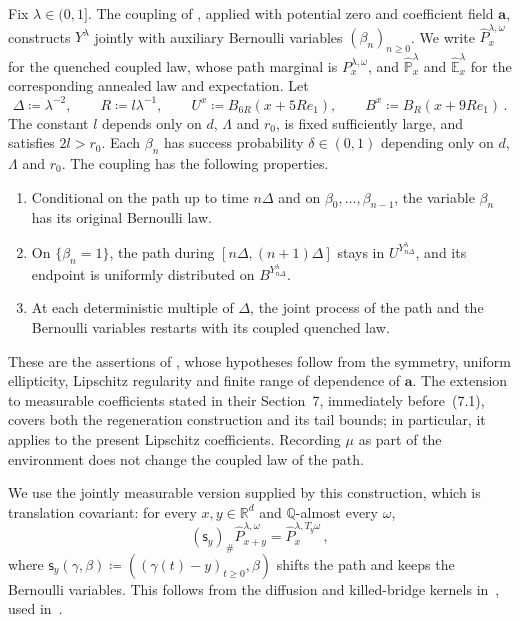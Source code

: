 \documentclass[11pt]{amsart}
\theoremstyle{definition}
\theoremstyle{remark}
\numberwithin{equation}{section}
\newcommand{\Q}{\mathbb Q}
\newcommand{\R}{\mathbb R}
\renewcommand{\a}{\mathbf a}
\begin{document}
Fix $\lambda\in(0,1]$. The coupling of \citet[Proposition~5.4]{Einstein2012gantert}, applied with potential zero and coefficient field $\a$, constructs $Y^\lambda$ jointly with auxiliary Bernoulli variables $(\beta_n)_{n\geq0}$. We write $\widehat P^{\lambda,\omega}_x$ for the quenched coupled law, whose path marginal is $P^{\lambda,\omega}_x$, and $\widehat{\mathbb P}^\lambda_x$ and $\widehat{\mathbb E}^\lambda_x$ for the corresponding annealed law and expectation. Let
\begin{equation}\label{regen.scales}
 \Delta\coloneqq\lambda^{-2},\qquad R\coloneqq l\lambda^{-1},\qquad
 U^x\coloneqq B_{6R}(x+5Re_1),\qquad B^x\coloneqq B_R(x+9Re_1)\, .
\end{equation}
The constant $l$ depends only on $d$, $\Lambda$ and $r_0$, is fixed sufficiently large, and satisfies $2l>r_0$. Each $\beta_n$ has success probability $\delta\in(0,1)$ depending only on $d$, $\Lambda$ and $r_0$. The coupling has the following properties.
\begin{enumerate}
\item[(i)] Conditional on the path up to time $n\Delta$ and on $\beta_0,\ldots,\beta_{n-1}$, the variable $\beta_n$ has its original Bernoulli law.
\item[(ii)] On $\{\beta_n=1\}$, the path during $[n\Delta,(n+1)\Delta]$ stays in $U^{Y^\lambda_{n\Delta}}$, and its endpoint is uniformly distributed on $B^{Y^\lambda_{n\Delta}}$.
\item[(iii)] At each deterministic multiple of $\Delta$, the joint process of the path and the Bernoulli variables restarts with its coupled quenched law.
\end{enumerate}
These are the assertions of \citet[Proposition~5.4]{Einstein2012gantert}, whose hypotheses follow from the symmetry, uniform ellipticity, Lipschitz regularity and finite range of dependence of $\a$. The extension to measurable coefficients stated in their Section~7, immediately before~(7.1), covers both the regeneration construction and its tail bounds; in particular, it applies to the present Lipschitz coefficients. Recording $\mu$ as part of the environment does not change the coupled law of the path.

We use the jointly measurable version supplied by this construction, which is translation covariant: for every $x,y\in\R^d$ and $\Q$-almost every $\omega$,
\begin{equation*}
 (\mathsf s_y)_\#\widehat P^{\lambda,\omega}_{x+y}=\widehat P^{\lambda,T_y\omega}_x\, ,
\end{equation*}
where $\mathsf s_y(\gamma,\beta)\coloneqq((\gamma(t)-y)_{t\geq0},\beta)$ shifts the path and keeps the Bernoulli variables. This follows from the diffusion and killed-bridge kernels in~\citet[Theorem~2.1, (2.8)--(2.9)]{ballistic2003shen}, used in~\citet[Proposition~5.4 and Section~7]{Einstein2012gantert}.
\end{document}
